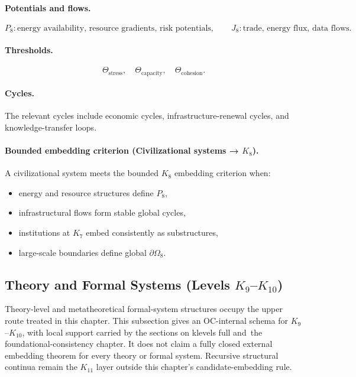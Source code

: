 \paragraph{Potentials and flows.}
\[
  P_8: \text{energy availability, resource gradients, risk potentials},\qquad
  J_8: \text{trade, energy flux, data flows}.
\]

\paragraph{Thresholds.}
\[
  \Theta_{\mathrm{stress}},\quad
  \Theta_{\mathrm{capacity}},\quad
  \Theta_{\mathrm{cohesion}}.
\]

\paragraph{Cycles.}
The relevant cycles include economic cycles, infrastructure-renewal cycles,
and knowledge-transfer loops.

\paragraph{Bounded embedding criterion (Civilizational systems → \texorpdfstring{\(K_8\)}{K8}).}
A civilizational system meets the bounded \(K_8\) embedding criterion when:
\begin{itemize}
  \item energy and resource structures define \(P_8\),
  \item infrastructural flows form stable global cycles,
  \item institutions at \(K_7\) embed consistently as substructures,
  \item large-scale boundaries define global \(\partial\Omega_8\).
\end{itemize}

\subsection{Theory and Formal Systems (Levels \texorpdfstring{$K_9$}{K9}--\texorpdfstring{$K_{10}$}{K10})}

Theory-level and metatheoretical formal-system structures occupy the upper
route treated in this chapter. This subsection gives an OC-internal schema for
\(K_9\)--\(K_{10}\), with local support carried by
the sections on klevels full and~the foundational-consistency chapter.
It does not claim a fully closed external embedding theorem for every theory
or formal system. Recursive structural continua remain the \(K_{11}\) layer
outside this chapter's candidate-embedding rule.

